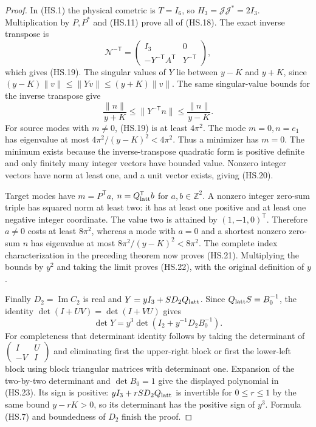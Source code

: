 \begin{proof}
In (HS.1) the physical cometric is $T=I_6$, so
$H_3=\mathcal J\mathcal J^*=2I_3$. Multiplication by $P,P^*$
and (HS.11) prove all of (HS.18). The exact inverse transpose is
\[
 \mathcal N^{-\mathsf T}
 =\begin{pmatrix}I_3&0\\-Y^{-\mathsf T}A^{\mathsf T}
                              &Y^{-\mathsf T}\end{pmatrix},
\]
which gives (HS.19). The singular values of $Y$ lie between
$y-K$ and $y+K$, since
$(y-K)\|v\|\leq\|Yv\|\leq(y+K)\|v\|$.
The same singular-value bounds for the inverse transpose give
\[
 \frac{\|n\|}{y+K}\leq\|Y^{-\mathsf T}n\|
                             \leq\frac{\|n\|}{y-K}.           \tag{HS.24}
\]
For source modes with $m\ne0$, (HS.19) is at least $4\pi^2$.
The mode $m=0,n=e_1$ has eigenvalue at most
$4\pi^2/(y-K)^2<4\pi^2$. Thus a minimizer has $m=0$.
The minimum exists because the inverse-transpose quadratic form is
positive definite and only finitely many integer vectors have bounded
value. Nonzero integer vectors have norm at least one, and a unit
vector exists, giving (HS.20).

Target modes have $m=P^{\mathsf T}a$, $n=Q_{\rm latt}^{\mathsf T}b$
for $a,b\in\mathbb Z^2$. A nonzero integer zero-sum triple has
squared norm at least two: it has at least one positive and at least
one negative integer coordinate. The value two is attained by
$(1,-1,0)^{\mathsf T}$. Therefore $a\ne0$ costs at least $8\pi^2$,
whereas a mode with $a=0$ and a shortest nonzero zero-sum $n$ has
eigenvalue at most $8\pi^2/(y-K)^2<8\pi^2$.
The complete index characterization in the preceding theorem now
proves (HS.21). Multiplying the bounds by $y^2$ and taking the limit
proves (HS.22), with the original definition of $y$.

Finally $D_2=\operatorname{Im}C_2$ is real and
$Y=yI_3+SD_2Q_{\rm latt}$. Since $Q_{\rm latt}S=B_0^{-1}$,
the identity
$\det(I+UV)=\det(I+VU)$ gives
\[
 \det Y=y^3\det(I_2+y^{-1}D_2B_0^{-1}).
\]
For completeness that determinant identity follows by taking the
determinant of
$\left(\begin{smallmatrix}I&U\\-V&I\end{smallmatrix}\right)$
and eliminating first the upper-right block or first the lower-left
block using block triangular matrices with determinant one.
Expansion of the two-by-two determinant and $\det B_0=1$ give
the displayed polynomial in (HS.23). Its sign is positive:
$yI_3+rSD_2Q_{\rm latt}$ is invertible for $0\leq r\leq1$ by
the same bound $y-rK>0$, so its determinant has the positive sign
of $y^3$. Formula (HS.7) and boundedness of $D_2$ finish the proof.
\end{proof}

